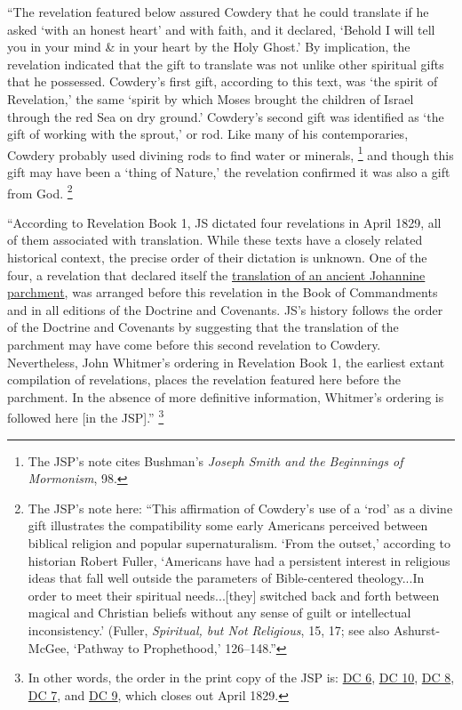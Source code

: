 			``The revelation featured below assured Cowdery that he could translate if he asked `with an honest heart' and with faith, and it declared, `Behold I will tell you in your mind \& in your heart by the Holy Ghost.' By implication, the revelation indicated that the gift to translate was not unlike other spiritual gifts that he possessed. Cowdery's first gift, according to this text, was `the spirit of Revelation,' the same `spirit by which Moses brought the children of Israel through the red Sea on dry ground.' Cowdery's second gift was identified as `the gift of working with the sprout,' or rod. Like many of his contemporaries, Cowdery probably used divining rods to find water or minerals,%
				\footnote{%
					The JSP's note cites Bushman's \textit{Joseph Smith and the Beginnings of Mormonism}, 98.
					}
			and though this gift may have been a `thing of Nature,' the revelation confirmed it was also a gift from God.%
				\footnote{%
					The JSP's note here: ``This affirmation of Cowdery's use of a `rod' as a divine gift illustrates the compatibility some early Americans perceived between biblical religion and popular supernaturalism. `From the outset,' according to historian Robert Fuller, `Americans have had a persistent interest in religious ideas that fall well outside the parameters of Bible-centered theology...In order to meet their spiritual needs...[they] switched back and forth between magical and Christian beliefs without any sense of guilt or intellectual inconsistency.' (Fuller, \textit{Spiritual, but Not Religious}, 15, 17; see also Ashurst-McGee, `Pathway to Prophethood,' 126--148.''
					}
			
			``According to Revelation Book 1, JS dictated four revelations in April 1829, all of them associated with translation. While these texts have a closely related historical context, the precise order of their dictation is unknown. One of the four, a revelation that declared itself the \hyperref[DC7]{translation of an ancient Johannine parchment}, was arranged before this revelation in the Book of Commandments and in all editions of the Doctrine and Covenants. JS's history follows the order of the Doctrine and Covenants by suggesting that the translation of the parchment may have come before this second revelation to Cowdery. Nevertheless, John Whitmer's ordering in Revelation Book 1, the earliest extant compilation of revelations, places the revelation featured here before the parchment. In the absence of more definitive information, Whitmer's ordering is followed here [in the JSP].''%
				\footnote{%
					In other words, the order in the print copy of the JSP is: \hyperref[DC6]{DC 6}, \hyperref[DC10]{DC 10}, \hyperref[DC8]{DC 8}, \hyperref[DC7]{DC 7}, and \hyperref[DC9]{DC 9}, which closes out April 1829.
					}
		
